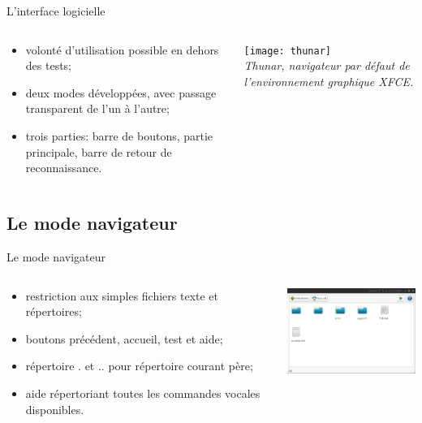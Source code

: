 \documentclass{beamer}
\begin{document}
\begin{frame}{L'interface logicielle}

	
	\begin{columns}[c]
	
	\begin{column}{5cm}
	\begin{itemize}
		\item volonté d'utilisation possible en dehors des tests;
		\item deux modes développées, avec passage transparent de l'un à l'autre;
		\item trois parties: barre de boutons, partie principale, barre de retour de reconnaissance.
	\end{itemize}
  	\end{column}
	\begin{column}{5cm}
		\texttt{[image: thunar]}\\
		\emph{\small Thunar, navigateur par défaut de l'environnement graphique XFCE.}
  	\end{column}
  	
  	\normalsize
	
	\end{columns}

\end{frame}

	\subsection{Le mode navigateur}

\begin{frame}{Le mode navigateur}

	\begin{columns}[c]
	
	\begin{column}{5cm}
	\begin{itemize}
		\item restriction aux simples fichiers texte et répertoires;
		\item boutons précédent, accueil, test et aide;
		\item répertoire . et .. pour répertoire courant père;
		\item aide répertoriant toutes les commandes vocales disponibles.
	\end{itemize}
  	\end{column}
	\begin{column}{5cm}
		\includegraphics[width=5cm]{explorer}\\
  	\end{column}
  	
  	\normalsize
	
	\end{columns}

\end{frame}
\end{document}
